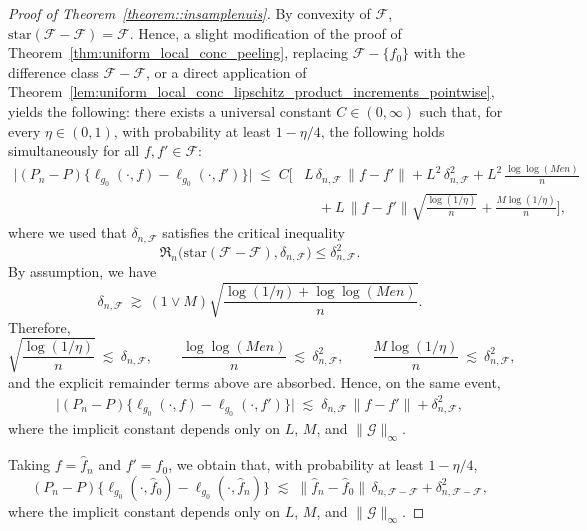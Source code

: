 \documentclass[11pt]{article}
\theoremstyle{plain}
\theoremstyle{definition} %
\begin{document}
\begin{proof}[Proof of Theorem~\ref{theorem::insamplenuis}]
By convexity of $\mathcal{F}$, $\mathrm{star}(\mathcal F-\mathcal F) = \mathcal{F}$. Hence, a slight modification of the proof of Theorem~\ref{thm:uniform_local_conc_peeling}, replacing $\mathcal{F}-\{f_0\}$ with the difference class $\mathcal{F}-\mathcal{F}$, or a direct application of Theorem~\ref{lem:uniform_local_conc_lipschitz_product_increments_pointwise}, yields the following: there exists a universal constant \(C\in(0,\infty)\) such that, for every \(\eta\in(0,1)\), with probability at least \(1-\eta/4\), the following holds simultaneously for all \(f,f'\in\mathcal F\):
\begin{align*}
\bigl|(P_n-P)\{\ell_{g_0}(\cdot,f)-\ell_{g_0}(\cdot,f')\}\bigr|
\;\le\;
C\Biggl[
&L\,\delta_{n,\mathcal F}\,\|f-f'\|
+
L^2\,\delta_{n,\mathcal F}^2
+
L^2\,\frac{\log\log(M e n)}{n}\\
&\quad +
L\,\|f-f'\|\sqrt{\frac{\log(1/\eta)}{n}}
+
\frac{M\log(1/\eta)}{n}
\Biggr],
\end{align*}
where we used that $\delta_{n,\mathcal F}$ satisfies the critical inequality
\[
\mathfrak R_n\bigl(\mathrm{star}(\mathcal F-\mathcal F),\delta_{n,\mathcal F}\bigr)
\le \delta_{n,\mathcal F}^2.
\]
By assumption, we have
\[
\delta_{n,\mathcal F}
\ \gtrsim\
(1 \vee M)\sqrt{\frac{\log(1/\eta)+\log\log(M e n)}{n}}.
\]
Therefore,
\[
\sqrt{\frac{\log(1/\eta)}{n}}
\ \lesssim\
\delta_{n,\mathcal F},
\qquad
\frac{\log\log(M e n)}{n}
\ \lesssim\
\delta_{n,\mathcal F}^2,
\qquad
\frac{M\log(1/\eta)}{n}
\ \lesssim\
\delta_{n,\mathcal F}^2,
\]
and the explicit remainder terms above are absorbed. Hence, on the same event,
\begin{align*}
\bigl|(P_n-P)\{\ell_{g_0}(\cdot,f)-\ell_{g_0}(\cdot,f')\}\bigr|
\;\lesssim\;
\delta_{n,\mathcal F}\,\|f-f'\|
+
\delta_{n,\mathcal F}^2,
\end{align*}
where the implicit constant depends only on $L$, $M$, and $\|\mathcal G\|_\infty$.

Taking $f=\hat f_n$ and $f'=\hat f_0$, we obtain that, with probability at least $1-\eta/4$,
\begin{equation}
\label{eqn::firstnuis}
(P_n-P)\{\ell_{g_0}(\cdot,\hat f_0)-\ell_{g_0}(\cdot,\hat f_n)\}
\;\lesssim\;
\|\hat f_n-\hat f_0\|\,\delta_{n,\mathcal{F}-\mathcal{F}}
+
\delta_{n,\mathcal{F}-\mathcal{F}}^2,
\end{equation}
where the implicit constant depends only on $L$, $M$, and $\|\mathcal G\|_\infty$.


\end{proof}
\end{document}
